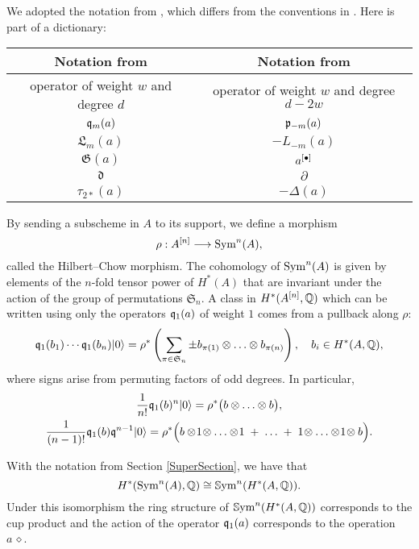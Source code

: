 \begin{remark}
We adopted the notation from \cite{LiQinWang}, which differs from the conventions in \cite{LehnSorger}. Here is part of a dictionary:
\begin{center}
\begin{tabular}{c|c} 
Notation from \cite{LiQinWang} & Notation from \cite{LehnSorger} \\\hline
operator of weight $w$ and degree $d$ & operator of weight $w$ and degree $d-2w$\\
$\mathfrak{q}_m(a) $ & $\mathfrak{p}_{-m}(a)$ \\
$ \mathfrak{L}_m(a) $ & $ - L_{-m}(a)$ \\
$\mathfrak{G}(a)$ & $a^{[\bullet]}$\\
$ \mathfrak{d} $ & $ \partial $ \\
$\tau_{2*}(a)$& $-\Delta(a)$
\end{tabular}
\end{center}
\end{remark}

By sending a subscheme in $A$ to its support, we define a morphism
\begin{equation}\label{HilbertChow}
\rho : A^{[n]} \longrightarrow \operatorname{Sym}^n(A),
\end{equation}
called the Hilbert--Chow morphism. The cohomology of $\operatorname{Sym}^n(A)$ is given by elements of the $n$-fold tensor power of $H^*(A)$ that are invariant under the action of the group of permutations $\mathfrak{S}_n$. A class in $H^*(A^{[n]},\mathbb{Q})$ which can be written using only the operators $\mathfrak{q}_1(a)$ of weight $1$ comes from a pullback along $\rho$:
\begin{equation}
\label{qSym}
\mathfrak{q}_1(b_1)\cdots \mathfrak{q}_1(b_n)|0\rangle = \rho^*\left( \sum_{\pi\in\mathfrak{S}_n } \pm b_{\pi(1)}\otimes\ldots\otimes b_{\pi(n)} \right), \quad b_i\in H^*(A,\mathbb{Q}),
\end{equation}
where signs arise from permuting factors of odd degrees. In particular,
\begin{gather} \label{q0primitive}
\frac{1}{n!}\mathfrak{q}_1(b)^n |0\rangle = \rho^*\big( b\otimes \ldots \otimes b\big),
\\ \label{q1primitive}
\frac{1}{(n-1)!}\mathfrak{q}_1(b)\mathfrak{q}^{n-1}|0\rangle =\rho^*\Big( b\otimes\! 1\!\otimes\ldots\otimes\! 1\; + \;\ldots\; +\; 1\!\otimes\ldots\otimes\! 1\! \otimes b\Big) .
\end{gather}
\begin{remark}
With the notation from Section \ref{SuperSection}, we have that
$$
H^*(\operatorname{Sym}^n(A),\mathbb{Q}) \cong \operatorname{\mathbb Sym}^n(H^*(A,\mathbb{Q})).
$$
Under this isomorphism the ring structure of $\operatorname{\mathbb Sym}^n(H^*(A,\mathbb{Q}))$ corresponds to the cup product and the action of the operator $\mathfrak{q}_1(a)$ corresponds to the operation $a\,\diamond$.
\end{remark}

